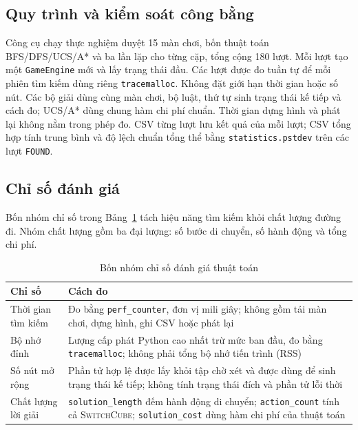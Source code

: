 \subsection{Quy trình và kiểm soát công bằng}

Công cụ chạy thực nghiệm duyệt 15 màn chơi, bốn thuật toán BFS/DFS/UCS/A* và ba
lần lặp cho từng cặp, tổng cộng 180 lượt. Mỗi lượt tạo một \texttt{GameEngine}
mới và lấy trạng thái đầu. Các lượt được đo tuần tự để mỗi phiên tìm kiếm dùng
riêng \texttt{tracemalloc}. Không đặt giới hạn thời gian hoặc số nút. Các bộ
giải dùng cùng màn chơi, bộ luật, thứ tự sinh trạng thái kế tiếp và cách đo;
UCS/A* dùng chung hàm chi phí chuẩn. Thời gian dựng hình và phát lại không nằm
trong phép đo. CSV từng lượt lưu kết quả của mỗi lượt; CSV tổng hợp tính trung
bình và độ lệch chuẩn tổng thể bằng \texttt{statistics.pstdev} trên các lượt
\texttt{FOUND}.

\subsection{Chỉ số đánh giá}

Bốn nhóm chỉ số trong Bảng~\ref{tab:metrics} tách hiệu năng tìm kiếm khỏi chất
lượng đường đi. Nhóm chất lượng gồm ba đại lượng: số bước di chuyển, số hành
động và tổng chi phí.

\begin{table}[H]
\centering
\caption{Bốn nhóm chỉ số đánh giá thuật toán}
\label{tab:metrics}
\small
\renewcommand{\arraystretch}{1.18}
\begin{tabularx}{\textwidth}{@{}l>{\raggedright\arraybackslash}X@{}}
\toprule
\textbf{Chỉ số} & \textbf{Cách đo} \\
\midrule
Thời gian tìm kiếm & Đo bằng \texttt{perf\_counter}, đơn vị mili giây; không gồm tải màn chơi, dựng hình, ghi CSV hoặc phát lại \\
\addlinespace[2pt]
Bộ nhớ đỉnh & Lượng cấp phát Python cao nhất trừ mức ban đầu, đo bằng \texttt{tracemalloc}; không phải tổng bộ nhớ tiến trình (RSS) \\
\addlinespace[2pt]
Số nút mở rộng & Phần tử hợp lệ được lấy khỏi tập chờ xét và được dùng để sinh trạng thái kế tiếp; không tính trạng thái đích và phần tử lỗi thời \\
\addlinespace[2pt]
Chất lượng lời giải & \texttt{solution\_length} đếm hành động di chuyển; \texttt{action\_count} tính cả \textsc{SwitchCube}; \texttt{solution\_cost} dùng hàm chi phí của thuật toán \\
\bottomrule
\end{tabularx}
\end{table}


